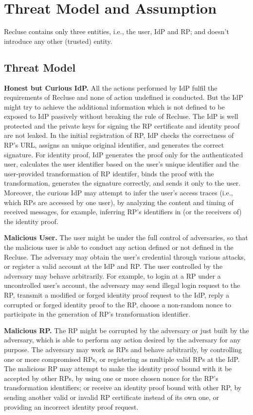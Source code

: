 \section{Threat Model and Assumption}
\label{sec:assumptionandthreatmodel}
Recluse contains only three entities, i.e., the user, IdP and RP; and doesn't introduce any other (trusted) entity. 


\subsection{Threat Model}

\textbf{Honest but Curious IdP.} All the actions performed by IdP fulfil the requirements of Recluse and none of action undefined is conducted. 
But the IdP might try to achieve the additional information which is not defined to be exposed to IdP passively without breaking the rule of Recluse.
The IdP is well protected and the private keys for signing the RP certificate and identity proof are not leaked. In the initial registration of RP,  IdP checks the correctness of RP's URL,  assigns an unique original identifier, and generates the correct signature. For identity proof, IdP generates the proof only for the authenticated user, calculates the user identifier based on the user's unique identifier and the user-provided transformation of RP identifer, binds the proof with the transformation, generates the signature correctly, and sends it only to the user. Moreover, the curious IdP may attempt to infer the user's access traces (i.e., which RPs are accessed by one user), by analyzing the content and timing of received messages, for example, inferring RP's identifiers in (or the receivers of) the identity proof. 

\textbf{Malicious User.} The user might be under the full control of adversaries, so that the malicious user is able to conduct any action defined or not defined in the Recluse. 
The adversary may obtain the user's credential through various attacks, or register a valid account at the IdP and RP. The user controlled by the adversary may behave arbitrarily. For example, to login at a RP under a uncontrolled user's account, the adversary may send illegal login request to the RP, transmit a modified or forged identity proof request to the IdP, reply a corrupted or forged identity proof to the RP,  choose a non-random nonce to participate in the generation of RP's transformation identifier.


\textbf{Malicious RP.} The RP might be corrupted by the adversary or just built by the adversary, which is able to perform any action desired by the adversary for any purpose. 
The adversary may work as RPs and behave arbitrarily, by controlling one or more compromised RPs, or registering as multiple valid RPs at the IdP. The malicious RP may attempt to make the identity proof bound with it be  accepted by other RPs, by using one or more chosen nonce for the RP's transformation identifiers; or receive an identity proof bound with other RP, by sending another valid or invalid RP certificate instead of its own one, or providing an incorrect identity proof request. 


